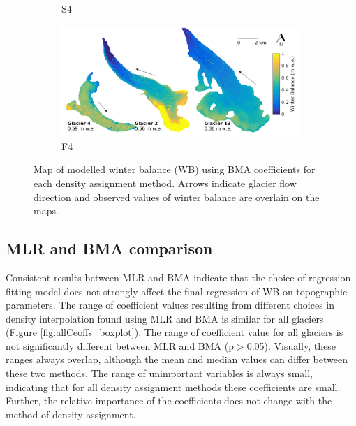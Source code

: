 \documentclass{sfuthesis}
\newcommand{\swedots}{Arrows indicate glacier flow direction and observed values of winter balance are overlain on the maps. }
\begin{document}
{\begin{figure}[H]
\begin{subfigure}[b]{0.475\textwidth}
            \caption[]%
            {{\small S4}}    
        \end{subfigure}
        \quad
        \begin{subfigure}[b]{0.475\textwidth}   
            \centering 
            \includegraphics[width=\textwidth]{BMSmap_Modelled_Observed8.png}
            \caption[]%
            {{\small F4}}    
        \end{subfigure}
              
        \caption[Map of modelled winter balance (WB) using BMA coefficients for each density assignment method]
        {Map of modelled winter balance (WB) using BMA coefficients for each density assignment method. \swedots} 
        \label{fig:allBMSmodelled}
    \end{figure}




\subsection{MLR and BMA comparison}


Consistent results between MLR and BMA indicate that the choice of regression fitting model does not strongly affect the final regression of WB on topographic parameters. The range of coefficient values resulting from different choices in density interpolation found using MLR and BMA is similar for all glaciers (Figure \ref{fig:allCeoffs_boxplot}). The range of coefficient value for all glaciers is not significantly different between MLR and BMA (p$>$0.05). Visually, these ranges always overlap, although the mean and median values can differ between these two methods. The range of unimportant variables is always small, indicating that for all density assignment methods these coefficients are small. Further, the relative importance of the coefficients does not change with the method of density assignment. 

}
\end{document}
